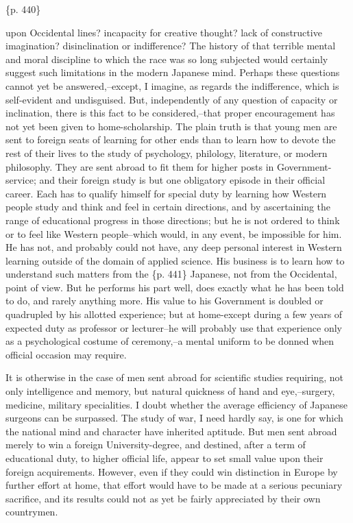 \{p. 440\}

upon Occidental lines? incapacity for creative thought? lack of constructive imagination? disinclination or indifference? The history of that terrible mental and moral discipline to which the race was so long subjected would certainly suggest such limitations in the modern Japanese mind. Perhaps these questions cannot yet be answered,--except, I imagine, as regards the indifference, which is self-evident and undisguised. But, independently of any question of capacity or inclination, there is this fact to be considered,--that proper encouragement has not yet been given to home-scholarship. The plain truth is that young men are sent to foreign seats of learning for other ends than to learn how to devote the rest of their lives to the study of psychology, philology, literature, or modern philosophy. They are sent abroad to fit them for higher posts in Government-service; and their foreign study is but one obligatory episode in their official career. Each has to qualify himself for special duty by learning how Western people study and think and feel in certain directions, and by ascertaining the range of educational progress in those directions; but he is not ordered to think or to feel like Western people--which would, in any event, be impossible for him. He has not, and probably could not have, any deep personal interest in Western learning outside of the domain of applied science. His business is to learn how to understand such matters from the \{p. 441\} Japanese, not from the Occidental, point of view. But he performs his part well, does exactly what he has been told to do, and rarely anything more. His value to his Government is doubled or quadrupled by his allotted experience; but at home-except during a few years of expected duty as professor or lecturer--he will probably use that experience only as a psychological costume of ceremony,--a mental uniform to be donned when official occasion may require.

It is otherwise in the case of men sent abroad for scientific studies requiring, not only intelligence and memory, but natural quickness of hand and eye,--surgery, medicine, military specialities. I doubt whether the average efficiency of Japanese surgeons can be surpassed. The study of war, I need hardly say, is one for which the national mind and character have inherited aptitude. But men sent abroad merely to win a foreign University-degree, and destined, after a term of educational duty, to higher official life, appear to set small value upon their foreign acquirements. However, even if they could win distinction in Europe by further effort at home, that effort would have to be made at a serious pecuniary sacrifice, and its results could not as yet be fairly appreciated by their own countrymen.



